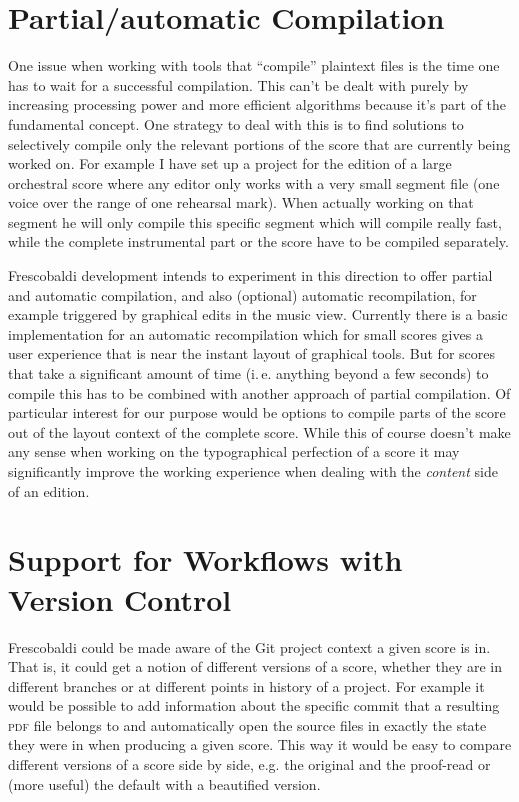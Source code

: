 \documentclass[oneside]{OLLbook}
\begin{document}
\section{Partial/automatic Compilation}\label{sec:partial/automatic-compilation}
One issue when working with tools that “compile” plaintext files is the time one has to wait for a successful compilation.
This can't be dealt with purely by increasing processing power and more efficient algorithms because it's part of the fundamental concept.
One strategy to deal with this is to find solutions to selectively compile only the relevant portions of the score that are currently being worked on.
For example I have set up a project for the edition of a large orchestral score where any editor only works with a very small segment file (one voice over the range of one rehearsal mark).
When actually working on that segment he will only compile this specific segment which will compile really fast, while the complete instrumental part or the score have to be compiled separately.

Frescobaldi development intends to experiment in this direction to offer partial and automatic compilation, and also (optional) automatic recompilation, for example triggered by graphical edits in the music view.
Currently there is a basic implementation for an automatic recompilation which for small scores gives a user experience that is near the instant layout of graphical tools.
But for scores that take a significant amount of time (i.\,e. anything beyond a few seconds) to compile this has to be combined with another approach of partial compilation.
Of particular interest for our purpose would be options to compile parts of the score out of the layout context of the complete score.
While this of course doesn't make any sense when working on the typographical perfection of a score it may significantly improve the working experience when dealing with the \emph{content} side of an edition.

\section{Support for Workflows with Version Control}\label{sec:support-for-workflows-with-version-control}
Frescobaldi could be made aware of the Git project context a given score is in.
That is, it could get a notion of different versions of a score, whether they are in different branches or at different points in history of a project.
For example it would be possible to add information about the specific commit that a resulting \textsc{pdf} file belongs to and automatically open the source files in exactly the state they were in when producing a given score.
This way it would be easy to compare different versions of a score side by side, e.g. the original and the proof-read or (more useful) the default with a beautified version.
\end{document}
